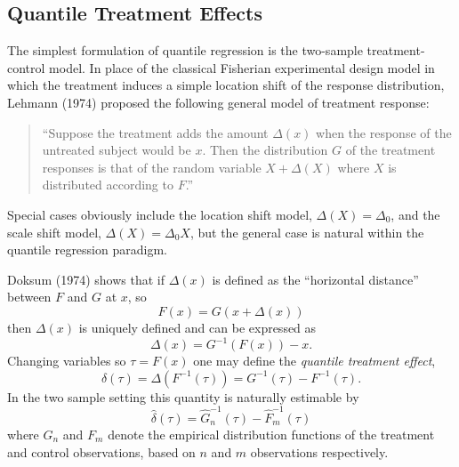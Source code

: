 \documentclass{amsart}
\begin{document}
\subsection{Quantile Treatment Effects}

The simplest formulation of quantile regression is the two-sample
treatment-control model.
In place of the classical Fisherian experimental design model in which
the treatment induces a simple location shift of the response distribution,
Lehmann (1974) proposed the following general model of treatment response:
\vspace{5mm}
\begin{quote}
``Suppose the treatment adds the amount $\Delta (x)$ when
the response of the untreated subject would be $x$.  Then the distribution $G$
of the treatment responses is that of the random variable $X+\Delta(X)$
where $X$ is distributed according to $F$.''
\end{quote}
\vspace{5mm}
Special cases obviously include the location shift model,
$\Delta (X) = \Delta_0$, and the scale shift model, $\Delta(X) = \Delta_0 X$,
but the general case is natural within the quantile regression paradigm.

Doksum (1974)
shows that if $\Delta (x)$ is defined as the ``horizontal distance''
between $F$ and $G$ at $x$, so
$$
F(x) = G(x+\Delta(x))
$$
then $\Delta (x)$ is uniquely defined and can be expressed as
\begin{equation*}\label{eq.LDte}
\Delta(x) = G^{-1}(F(x)) - x.
\end{equation*}
Changing variables so $\tau = F(x)$ one may define 
the {\it quantile treatment effect},
$$
\delta(\tau) = \Delta (F^{-1}(\tau)) = G^{-1}(\tau) - F^{-1} (\tau).
$$
In the two sample setting this quantity is naturally estimable by
$$
\hat\delta(\tau) = \hat G_n^{-1}(\tau) - \hat F_m^{-1}(\tau)
$$
where $G_n$ and $F_m$ denote the empirical distribution functions of the
treatment and control observations, based on $n$ and $m$
observations respectively.  
\end{document}
